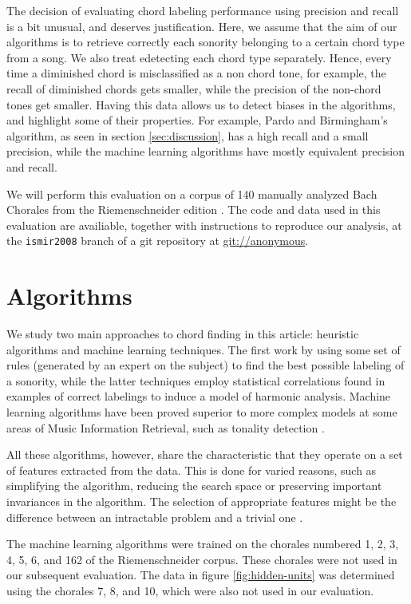 \documentclass{article}
\begin{document}
The decision of evaluating chord labeling performance using precision
and recall is a bit unusual, and deserves justification. Here, we
assume that the aim of our algorithms is to retrieve correctly each
sonority belonging to a certain chord type from a song. We also treat
edetecting each chord type separately. Hence, every time a diminished
chord is misclassified as a non chord tone, for example, the recall of
diminished chords gets smaller, while the precision of the non-chord
tones get smaller. Having this data allows us to detect biases in the
algorithms, and highlight some of their properties. For example, Pardo
and Birmingham's algorithm, as seen in section \ref{sec:discussion},
has a high recall and a small precision, while the machine learning
algorithms have mostly equivalent precision and recall.

We will perform this evaluation on a corpus of 140 manually analyzed
Bach Chorales from the Riemenschneider edition \cite{bach:371}. The
code and data used in this evaluation are availiable, together with
instructions to reproduce our analysis, at the \texttt{ismir2008}
branch of a git \cite{baudis:git} repository at \url{git://anonymous}.

\section{Algorithms}
\label{sec:algorithms}


We study two main approaches to chord finding in this article:
heuristic algorithms and machine learning techniques. The first work
by using some set of rules (generated by an expert on the subject) to
find the best possible labeling of a sonority, while the latter
techniques employ statistical correlations found in examples of
correct labelings to induce a model of harmonic analysis. Machine
learning algorithms have been proved superior to more complex models
at some areas of Music Information Retrieval, such as tonality
detection \cite{gomez.ea:estimating}.

All these algorithms, however, share the characteristic that they
operate on a set of features extracted from the data. This is done for
varied reasons, such as simplifying the algorithm, reducing the search
space or preserving important invariances in the algorithm. The
selection of appropriate features might be the difference between an
intractable problem and a trivial one \cite{duda.ea:statistical}.

The machine learning algorithms were trained on the chorales numbered
1, 2, 3, 4, 5, 6, and 162 of the Riemenschneider corpus. These
chorales were not used in our subsequent evaluation. The data in
figure \ref{fig:hidden-units} was determined using the chorales 7, 8,
and 10, which were also not used in our evaluation.
\end{document}
